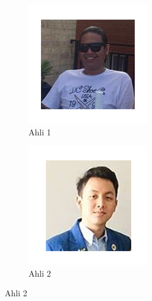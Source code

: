 		\begin{figure}[H]
			\centering
			\begin{subfigure}{.25\linewidth}{
				\includegraphics[width=1\linewidth]{gambar/ahli/gerald}
				\caption{Ahli 1}
				\label{ahli_1}
			}
			\end{subfigure}%
			\begin{subfigure}{.25\linewidth}{
				\includegraphics[width=1\linewidth]{gambar/ahli/harley}
				\caption{Ahli 2}
				\label{ahli_2}				
			}

\end{subfigure}
\end{figure}
